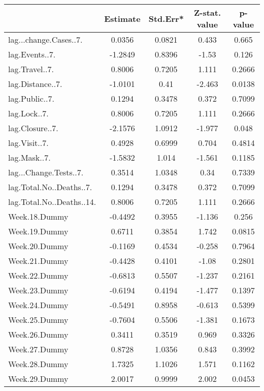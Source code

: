 \begingroup\tiny
\begin{longtable}{lcccc}
  \toprule
 & Estimate & Std.Err* & Z-stat. value & p-value \\ 
  \midrule
lag...change.Cases..7. & 0.0356 & 0.0821 & 0.433 & 0.665 \\ 
  lag.Events..7. & -1.2849 & 0.8396 & -1.53 & 0.126 \\ 
  lag.Travel..7. & 0.8006 & 0.7205 & 1.111 & 0.2666 \\ 
  lag.Distance..7. & -1.0101 & 0.41 & -2.463 & 0.0138 \\ 
  lag.Public..7. & 0.1294 & 0.3478 & 0.372 & 0.7099 \\ 
  lag.Lock..7. & 0.8006 & 0.7205 & 1.111 & 0.2666 \\ 
  lag.Closure..7. & -2.1576 & 1.0912 & -1.977 & 0.048 \\ 
  lag.Visit..7. & 0.4928 & 0.6999 & 0.704 & 0.4814 \\ 
  lag.Mask..7. & -1.5832 & 1.014 & -1.561 & 0.1185 \\ 
  lag...Change.Tests..7. & 0.3514 & 1.0348 & 0.34 & 0.7339 \\ 
  lag.Total.No..Deaths..7. & 0.1294 & 0.3478 & 0.372 & 0.7099 \\ 
  lag.Total.No..Deaths..14. & 0.8006 & 0.7205 & 1.111 & 0.2666 \\ 
  Week.18.Dummy & -0.4492 & 0.3955 & -1.136 & 0.256 \\ 
  Week.19.Dummy & 0.6711 & 0.3854 & 1.742 & 0.0815 \\ 
  Week.20.Dummy & -0.1169 & 0.4534 & -0.258 & 0.7964 \\ 
  Week.21.Dummy & -0.4428 & 0.4101 & -1.08 & 0.2801 \\ 
  Week.22.Dummy & -0.6813 & 0.5507 & -1.237 & 0.2161 \\ 
  Week.23.Dummy & -0.6194 & 0.4194 & -1.477 & 0.1397 \\ 
  Week.24.Dummy & -0.5491 & 0.8958 & -0.613 & 0.5399 \\ 
  Week.25.Dummy & -0.7604 & 0.5506 & -1.381 & 0.1673 \\ 
  Week.26.Dummy & 0.3411 & 0.3519 & 0.969 & 0.3326 \\ 
  Week.27.Dummy & 0.8728 & 1.0356 & 0.843 & 0.3992 \\ 
  Week.28.Dummy & 1.7325 & 1.1026 & 1.571 & 0.1162 \\ 
  Week.29.Dummy & 2.0017 & 0.9999 & 2.002 & 0.0453 \\ 

\end{longtable}
